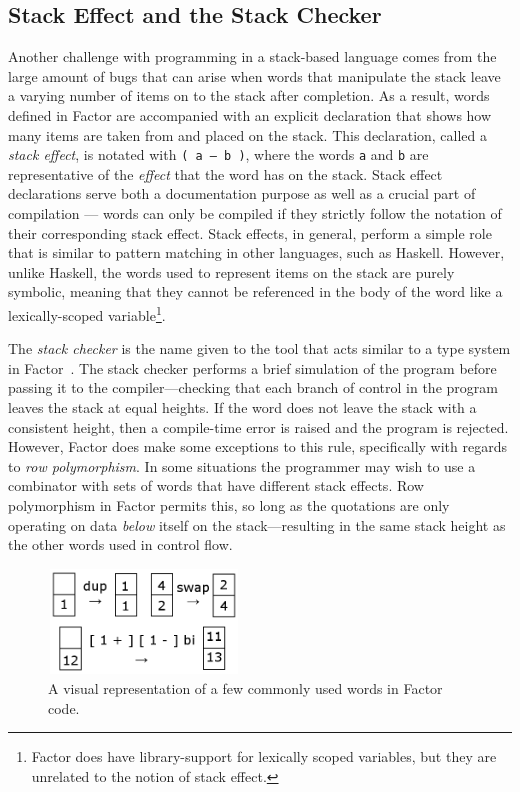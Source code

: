 \documentclass[sigconf]{acmart}
\begin{document}
\subsection{Stack Effect and the Stack Checker}
Another challenge with programming in a stack-based language
comes from the large amount of bugs that can arise when words
that manipulate the stack leave a varying number of items on to
the stack after completion. As a result, words defined in
Factor are accompanied with an explicit declaration that shows
how many items are taken from and placed on the stack. This 
declaration, called a \textit{stack effect}, is notated with
\texttt{( a -- b )}, where the words \texttt{a} and \texttt{b} are 
representative of the \textit{effect} that the word has on the
stack. Stack effect declarations serve both a documentation
purpose as well as a crucial part of compilation --- words can 
only be compiled if they strictly follow the notation of their
corresponding stack effect. Stack effects, in general, perform a 
simple role that is similar to pattern matching in other languages,
such as Haskell. However, unlike Haskell, the words used 
to represent items on the stack are purely symbolic, meaning that 
they cannot be referenced in the body of the word like a 
lexically-scoped variable\footnote{Factor does have library-support 
for lexically scoped variables, but they are unrelated to the 
notion of stack effect.}.

The \textit{stack checker} is the name given to the tool that acts
similar to a type system in Factor~\cite{pestov:Factor}. The
stack checker performs a brief simulation of the program 
before passing it to the compiler---checking that each
branch of control in the program leaves the stack at equal 
heights. If the word does not leave the stack with a consistent
height, then a compile-time error is raised and the program is
rejected. However, Factor does make some exceptions to this rule,
specifically with regards to \textit{row polymorphism}. In some
situations the programmer may wish to use a combinator with
sets of words that have different stack effects. Row polymorphism
in Factor permits this, so long as the quotations are only
operating on data \textit{below} itself on the stack---resulting
in the same stack height as the other words used in control flow.

\begin{figure}
\includegraphics[height=1.1in, width=2in]{figs/stackpic}
\caption{A visual representation of a few commonly used words in 
Factor code.}\label{fig:stackpic}\end{figure}
\end{document}
